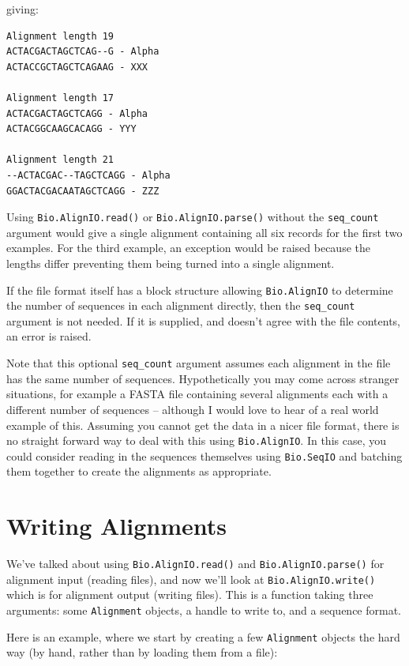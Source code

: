 \documentclass{report}
\begin{document}
\noindent giving:

\begin{verbatim}
Alignment length 19
ACTACGACTAGCTCAG--G - Alpha
ACTACCGCTAGCTCAGAAG - XXX

Alignment length 17
ACTACGACTAGCTCAGG - Alpha
ACTACGGCAAGCACAGG - YYY

Alignment length 21
--ACTACGAC--TAGCTCAGG - Alpha
GGACTACGACAATAGCTCAGG - ZZZ
\end{verbatim}

Using \verb|Bio.AlignIO.read()| or \verb|Bio.AlignIO.parse()| without the \verb|seq_count| argument would give a single alignment containing all six records for the first two examples.  For the third example, an exception would be raised because the lengths differ preventing them being turned into a single alignment.

If the file format itself has a block structure allowing \verb|Bio.AlignIO| to determine the number of sequences in each alignment directly, then the \verb|seq_count| argument is not needed.  If it is supplied, and doesn't agree with the file contents, an error is raised.

Note that this optional \verb|seq_count| argument assumes each alignment in the file has the same number of sequences.  Hypothetically you may come across stranger situations, for example a FASTA file containing several alignments each with a different number of sequences -- although I would love to hear of a real world example of this.  Assuming you cannot get the data in a nicer file format, there is no straight forward way to deal with this using \verb|Bio.AlignIO|.  In this case, you could consider reading in the sequences themselves using \verb|Bio.SeqIO| and batching them together to create the alignments as appropriate.

\section{Writing Alignments}

We've talked about using \verb|Bio.AlignIO.read()| and \verb|Bio.AlignIO.parse()| for alignment input (reading files), and now we'll look at \verb|Bio.AlignIO.write()| which is for alignment output (writing files).  This is a function taking three arguments: some \verb|Alignment| objects, a handle to write to, and a sequence format.

Here is an example, where we start by creating a few \verb|Alignment| objects the hard way (by hand, rather than by loading them from a file):
\end{document}
